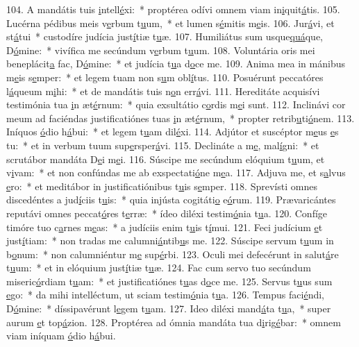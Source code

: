 104. A mandátis tuis \uline{i}ntell\uline{é}xi:~* proptérea odívi omnem viam in\uline{i}quit\uline{á}tis.
105. Lucérna pédibus meis v\uline{e}rbum t\uline{u}um,~* et lumen s\uline{é}mitis m\uline{e}is.
106. Jur\uline{á}vi, et st\uline{á}tui~* custodíre judícia just\uline{í}tiæ t\uline{u}æ.
107. Humiliátus sum usque\uline{quá}que, D\uline{ó}mine:~* vivífica me secúndum v\uline{e}rbum t\uline{u}um.
108. Voluntária oris mei beneplácit\uline{a} fac, D\uline{ó}mine:~* et judícia t\uline{u}a d\uline{o}ce me.
109. Anima mea in mánibus m\uline{e}is s\uline{e}mper:~* et legem tuam non s\uline{u}m obl\uline{í}tus.
110. Posuérunt peccatóres l\uline{á}queum m\uline{i}hi:~* et de mandátis tuis n\uline{o}n err\uline{á}vi.
111. Hereditáte acquisívi testimónia tua \uline{i}n æt\uline{é}rnum:~* quia exsultátio c\uline{o}rdis m\uline{e}i sunt.
112. Inclinávi cor meum ad faciéndas justificatiónes tuas \uline{i}n æt\uline{é}rnum,~* propter retrib\uline{u}ti\uline{ó}nem.
113. Iníquos \uline{ó}dio h\uline{á}bui:~* et legem t\uline{u}am dil\uline{é}xi.
114. Adjútor et suscéptor m\uline{e}us \uline{e}s tu:~* et in verbum tuum sup\uline{e}rsper\uline{á}vi.
115. Declináte a m\uline{e}, mal\uline{í}gni:~* et scrutábor mandáta D\uline{e}i m\uline{e}i.
116. Súscipe me secúndum elóquium t\uline{u}um, et v\uline{i}vam:~* et non confúndas me ab exspectati\uline{ó}ne m\uline{e}a.
117. Adjuva me, et s\uline{a}lvus \uline{e}ro:~* et meditábor in justificatiónibus t\uline{u}is s\uline{e}mper.
118. Sprevísti omnes discedéntes a jud\uline{í}ciis t\uline{u}is:~* quia injústa cogitáti\uline{o} e\uline{ó}rum.
119. Prævaricántes reputávi omnes peccat\uline{ó}res t\uline{e}rræ:~* ídeo diléxi testim\uline{ó}nia t\uline{u}a.
120. Confíge timóre tuo c\uline{a}rnes m\uline{e}as:~* a judíciis enim t\uline{u}is t\uline{í}mui.
121. Feci judícium \uline{e}t just\uline{í}tiam:~* non tradas me calumni\uline{á}ntib\uline{u}s me.
122. Súscipe servum t\uline{u}um in b\uline{o}num:~* non calumniéntur m\uline{e} sup\uline{é}rbi.
123. Oculi mei defecérunt in salut\uline{á}re t\uline{u}um:~* et in elóquium just\uline{í}tiæ t\uline{u}æ.
124. Fac cum servo tuo secúndum miseric\uline{ó}rdiam t\uline{u}am:~* et justificatiónes t\uline{u}as d\uline{o}ce me.
125. Servus t\uline{u}us sum \uline{e}go:~* da mihi intelléctum, ut sciam testim\uline{ó}nia t\uline{u}a.
126. Tempus faci\uline{é}ndi, D\uline{ó}mine:~* díssipavérunt l\uline{e}gem t\uline{u}am.
127. Ideo diléxi mand\uline{á}ta t\uline{u}a,~* super aurum \uline{e}t top\uline{á}zion.
128. Proptérea ad ómnia mandáta tua d\uline{i}rig\uline{é}bar:~* omnem viam iníquam \uline{ó}dio h\uline{á}bui.
